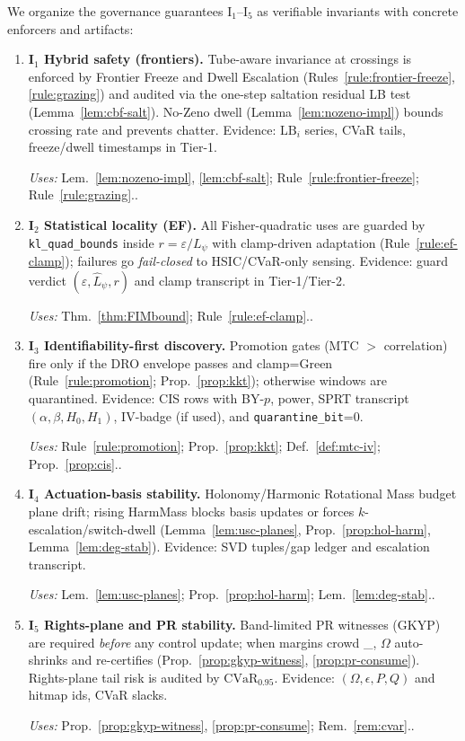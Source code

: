 \documentclass[10pt]{article}
\newcommand{\uses}[1]{\par\smallskip\noindent\textit{Uses: }#1.\par\smallskip}
\providecommand{\constsymPRmargin}{\varepsilon_{\mathrm{PR}}}
\begin{document}
We organize the governance guarantees I\(_1\)–I\(_5\) as verifiable invariants with concrete enforcers and artifacts:

\begin{enumerate}[leftmargin=*]
\item \textbf{I\(_1\) Hybrid safety (frontiers).}
Tube-aware invariance at crossings is enforced by Frontier Freeze and Dwell Escalation (Rules~\ref{rule:frontier-freeze}, \ref{rule:grazing}) and audited via the one-step saltation residual LB test (Lemma~\ref{lem:cbf-salt}). No-Zeno dwell (Lemma~\ref{lem:nozeno-impl}) bounds crossing rate and prevents chatter. Evidence: $\mathrm{LB}_i$ series, CVaR tails, freeze/dwell timestamps in Tier-1.
\uses{Lem.~\ref{lem:nozeno-impl}, \ref{lem:cbf-salt}; Rule~\ref{rule:frontier-freeze}; Rule~\ref{rule:grazing}.}

\item \textbf{I\(_2\) Statistical locality (EF).}
All Fisher-quadratic uses are guarded by \texttt{kl\_quad\_bounds} inside $r=\varepsilon/L_\psi$ with clamp-driven adaptation (Rule~\ref{rule:ef-clamp}); failures go \emph{fail-closed} to HSIC/CVaR-only sensing. Evidence: guard verdict $(\varepsilon,\hat L_\psi,r)$ and clamp transcript in Tier-1/Tier-2.
\uses{Thm.~\ref{thm:FIMbound}; Rule~\ref{rule:ef-clamp}.}

\item \textbf{I\(_3\) Identifiability-first discovery.}
Promotion gates (MTC $>$ correlation) fire only if the DRO envelope passes and clamp=Green (Rule~\ref{rule:promotion}; Prop.~\ref{prop:kkt}); otherwise windows are quarantined. Evidence: CIS rows with BY-$p$, power, SPRT transcript $(\alpha,\beta,H_0,H_1)$, IV-badge (if used), and \texttt{quarantine\_bit}=0.
\uses{Rule~\ref{rule:promotion}; Prop.~\ref{prop:kkt}; Def.~\ref{def:mtc-iv}; Prop.~\ref{prop:cis}.}

\item \textbf{I\(_4\) Actuation-basis stability.}
Holonomy/Harmonic Rotational Mass budget plane drift; rising HarmMass blocks basis updates or forces $k$-escalation/switch-dwell (Lemma~\ref{lem:usc-planes}, Prop.~\ref{prop:hol-harm}, Lemma~\ref{lem:deg-stab}). Evidence: SVD tuples/gap ledger and escalation transcript.
\uses{Lem.~\ref{lem:usc-planes}; Prop.~\ref{prop:hol-harm}; Lem.~\ref{lem:deg-stab}.}

\item \textbf{I\(_5\) Rights-plane and PR stability.}
Band-limited PR witnesses (GKYP) are required \emph{before} any control update; when margins crowd \constsymPRmargin, $\Omega$ auto-shrinks and re-certifies (Prop.~\ref{prop:gkyp-witness}, \ref{prop:pr-consume}). Rights-plane tail risk is audited by $\mathrm{CVaR}_{0.95}$. Evidence: $(\Omega,\epsilon,P,Q)$ and hitmap ids, CVaR slacks.
\uses{Prop.~\ref{prop:gkyp-witness}, \ref{prop:pr-consume}; Rem.~\ref{rem:cvar}.}
\end{enumerate}
\end{document}
